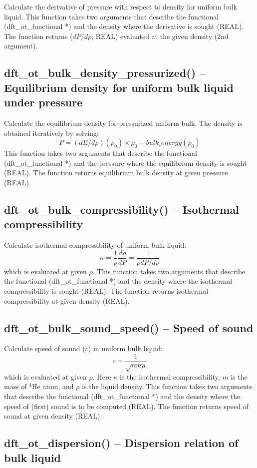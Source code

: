 \documentclass[12pt,letterpaper]{report}
\begin{document}
Calculate the derivative of pressure with respect to density for uniform bulk liquid. This function takes two arguments that describe the functional (dft\_ot\_functional *) and the density where the derivative is sought (REAL). The function returns ($dP/d\rho$; REAL) evaluated at the given density (2nd argument).

\subsection{dft\_ot\_bulk\_density\_pressurized() -- Equilibrium density for uniform bulk liquid under pressure}

Calculate the equilibrium density for pressurized uniform bulk. The density is obtained iteratively by solving:
$$P = (dE/d\rho)(\rho_0)\times\rho_0 - bulk\_energy(\rho_0)$$
This function takes two arguments that describe the functional (dft\_ot\_functional *) and the pressure where the equilibrium density is sought (REAL). The function returns equilibrium bulk density at given pressure (REAL).

\subsection{dft\_ot\_bulk\_compressibility() -- Isothermal compressibility}

Calculate isothermal compressibility of uniform bulk liquid:
$$\kappa = \frac{1}{\rho} \frac{d\rho}{dP} = \frac{1}{\rho dP/d\rho}$$
which is evaluated at given $\rho$. This function takes two arguments that describe the functional (dft\_ot\_functional *) and the density where the isothermal compressibility is sought (REAL). The function returns isothermal compressibility at given density (REAL).

\subsection{dft\_ot\_bulk\_sound\_speed() -- Speed of sound}

Calculate speed of sound ($c$) in uniform bulk liquid:
$$ c = \frac{1}{\sqrt{m \kappa \rho}}$$
which is evaluated at given $\rho$. Here $\kappa$ is the isothermal compressibility, $m$ is the mass of $^4$He atom, and $\rho$ is the liquid density. This function takes two arguments that describe the functional (dft\_ot\_functional *) and the density where the speed of (first) sound is to be computed (REAL). The function returns speed of sound at given density (REAL).

\subsection{dft\_ot\_dispersion() -- Dispersion relation of bulk liquid}
\end{document}
